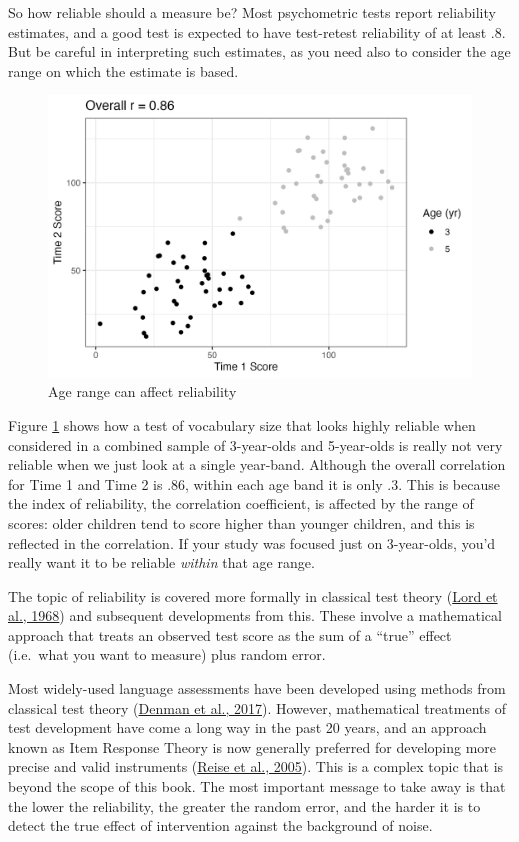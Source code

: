 \documentclass{krantz}
\begin{document}
So how reliable should a measure be? Most psychometric tests report reliability estimates, and a good test is expected to have test-retest reliability of at least .8. But be careful in interpreting such estimates, as you need also to consider the age range on which the estimate is based.

\begin{figure}
\includegraphics[width=0.8\linewidth]{images_bw/reliability-by-age} \caption{Age range can affect reliability}\label{fig:reliability-by-age}
\end{figure}

Figure \ref{fig:reliability-by-age} shows how a test of vocabulary size that looks highly reliable when considered in a combined sample of 3-year-olds and 5-year-olds is really not very reliable when we just look at a single year-band. Although the overall correlation for Time 1 and Time 2 is .86, within each age band it is only .3. This is because the index of reliability, the correlation coefficient, is affected by the range of scores: older children tend to score higher than younger children, and this is reflected in the correlation. If your study was focused just on 3-year-olds, you'd really want it to be reliable \emph{within} that age range.

The topic of reliability is covered more formally in classical test theory (\protect\hyperlink{ref-lord1968}{Lord et al., 1968})  and subsequent developments from this. These involve a mathematical approach that treats an observed test score as the sum of a ``true'' effect (i.e.~what you want to measure) plus random error.

Most widely-used language assessments have been developed using methods from classical test theory (\protect\hyperlink{ref-denman2017}{Denman et al., 2017}). However, mathematical treatments of test development have come a long way in the past 20 years, and an approach known as Item Response Theory is now generally preferred for developing more precise and valid instruments (\protect\hyperlink{ref-reise2005}{Reise et al., 2005}). This is a complex topic that is beyond the scope of this book. The most important message to take away is that the lower the reliability, the greater the random error, and the harder it is to detect the true effect of intervention against the background of noise.
\end{document}
